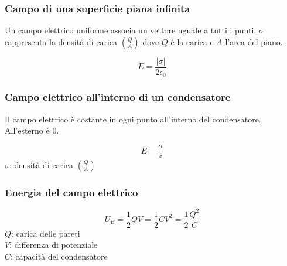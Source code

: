 \subsubsection{Campo di una superficie piana infinita}
Un campo elettrico uniforme associa un vettore uguale a tutti i punti. $\sigma$ rappresenta la 
densità di carica $\left(\frac{Q}{A}\right)$ dove $Q$ è la carica e $A$ l'area del piano.
\begin{center}
\end{center}
\begin{equation*}
  E = \frac{\left\lvert\sigma\right\rvert}{2\epsilon_0}
\end{equation*}

\subsubsection{Campo elettrico all'interno di un condensatore}
Il campo elettrico è costante in ogni punto all'interno del condensatore. All'esterno è $0$.
\begin{center}
\end{center}
\begin{equation*}
  E = \frac{\sigma}{\varepsilon}
\end{equation*}
$\sigma$: densità di carica $\left(\frac{Q}{A}\right)$

\subsubsection{Energia del campo elettrico}
\begin{equation*}
  U_E = \frac{1}{2}QV = \frac{1}{2}CV^2 = \frac{1}{2}\frac{Q^2}{C}
\end{equation*}
$Q$: carica delle pareti\\
$V$: differenza di potenziale\\
$C$: capacità del condensatore\\ [\baselineskip]

